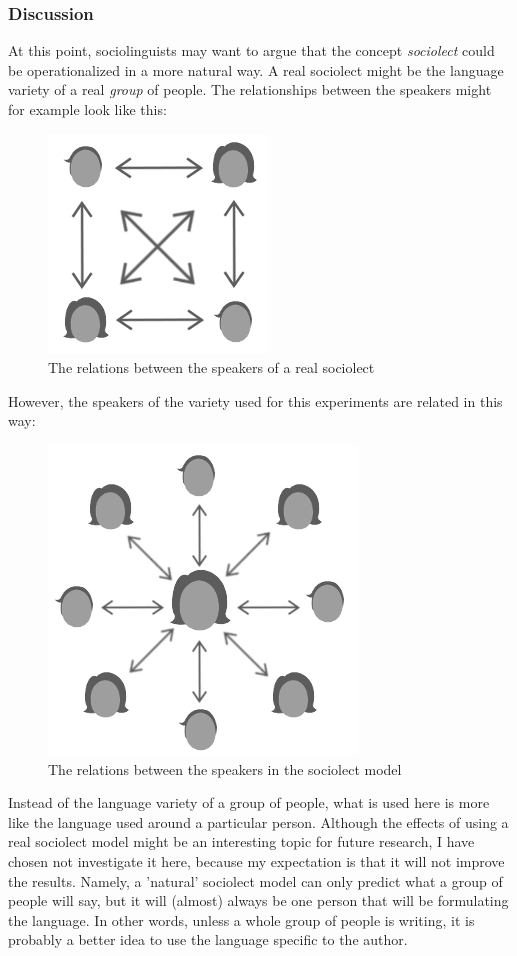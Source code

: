 \documentclass[12pt]{article}
\begin{document}
\subsubsection{Discussion}
At this point, sociolinguists may want to argue that the concept \emph{sociolect} could be operationalized in a more natural way. A real sociolect might be the language variety of a real \emph{group} of people. The relationships between the speakers might for example look like this:

\begin{figure}[H] \centering
\includegraphics[scale=0.75]{real_network}
\caption{The relations between the speakers of a real sociolect}
\end{figure} 

However, the speakers of the variety used for this experiments are related in this way:

\begin{figure}[H] \centering
\includegraphics[scale=0.75]{sloppy_network}
\caption{The relations between the speakers in the sociolect model}
\end{figure} 

Instead of the language variety of a group of people, what is used here is more like the language used around a particular person. Although the effects of using a real sociolect model might be an interesting topic for future research, I have chosen not investigate it here, because my expectation is that it will not improve the results. Namely, a 'natural' sociolect model can only predict what a group of people will say, but it will (almost) always be one person that will be formulating the language. In other words, unless a whole group of people is writing, it is probably a better idea to use the language specific to the author.
\end{document}
